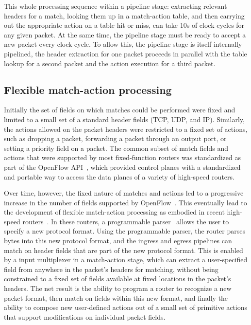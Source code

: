 This whole processing sequence within a pipeline stage: extracting relevant
headers for a match, looking them up in a match-action table, and then carrying
out the appropriate action on a table hit or miss, can take 10s of clock
cycles for any given packet. At the same time, the pipeline stage must be ready
to accept a new packet every clock cycle. To allow this, the pipeline stage is
itself internally pipelined, \ie the header extraction for one packet proceeds
in parallel with the table lookup for a second packet and the action execution
for a third packet.

\subsection{Flexible match-action processing}
Initially the set of fields on which matches could be performed were fixed and
limited to a small set of a standard header fields (\eg TCP, UDP, and IP).
Similarly, the actions allowed on the packet headers were restricted to a fixed
set of actions, such as dropping a packet, forwarding a packet through an
output port, or setting a priority field on a packet. The common subset of
match fields and actions that were supported by most fixed-function routers was
standardized as part of the OpenFlow API~\cite{openflow}, which provided
control planes with a standardized and portable way to access the data planes
of a variety of high-speed routers.

Over time, however, the fixed nature of matches and actions led to a
progressive increase in the number of fields supported by OpenFlow~\cite{p4}.
This eventually lead to the development of flexible match-action processing as
embodied in recent high-speed routers~\cite{xpliant, flexpipe, tofino}. In
these routers, a programmable parser~\cite{gibb_parsing} allows the user to
specify a new protocol format. Using the programmable parser, the router parses
bytes into this new protocol format, and the ingress and egress pipelines can
match on header fields that are part of the new protocol format.  This is
enabled by a input multiplexer in a match-action stage, which can extract a
user-specified field from anywhere in the packet's headers for matching,
without being constrained to a fixed set of fields available at fixed locations
in the packet's headers. The net result is the ability to program a router to
recognize a new packet format, then match on fields within this new format, and
finally the ability to compose new user-defined actions out of a small set of
primitive actions that support modifications on individual packet fields.

